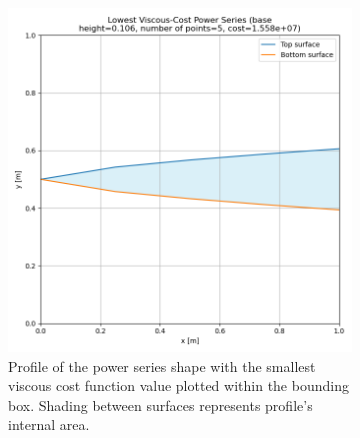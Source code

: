 \documentclass[11pt]{article}
\begin{document}
\begin{figure}[H]
\begin{subfigure}[b]{0.45\textwidth}
    \includegraphics[width=\linewidth]{../results/viscous/lowest_cost_power_series.png}
    \caption{Profile of the power series shape with the smallest viscous cost function value plotted within the bounding box. Shading between surfaces represents profile's internal area.}
    \label{fig:vis-power-b}
\end{subfigure}
\caption{}
\label{fig:vis-power}
\end{figure}
\end{document}
